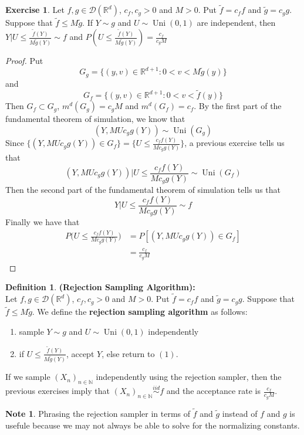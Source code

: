\documentclass[12pt]{amsart}
\theoremstyle{definition}
\newtheorem{defn}[definition]{Definition}
\newtheorem{note}[definition]{Note}
\newtheorem{ex}[definition]{Exercise}
\newcommand{\N}{\mathbb{N}}
\newcommand{\R}{\mathbb{R}}
\newcommand{\MD}{\mathcal{D}}
\newcommand{\iid}{\stackrel{iid}{\sim}}
\DeclareMathOperator{\uni}{Uni}
\begin{document}
	\begin{ex}
		Let $f, g \in \MD(\R^d)$, $c_f,c_g>0$ and $M > 0$. Put $\tilde{f} = c_f f$ and $\tilde{g} = c_g g$. Suppose that $\tilde{f} \leq M \tilde{g}$. If $Y \sim g$ and $U \sim \uni(0,1)$ are independent, then $Y|U \leq \frac{\tilde{f}(Y)}{M\tilde{g}(Y)} \sim f$ and $P ( U \leq \frac{\tilde{f}(Y)}{M\tilde{g}(Y)} ) = \frac{c_f}{c_gM}$ 
	\end{ex}

	\begin{proof}
		Put $$G_g = \{(y,v) \in \R^{d+1}: 0< v < M\tilde{g}(y)\} $$ and $$ G_f = \{(y,v) \in \R^{d+1}: 0< v < \tilde{f}(y)\} $$ 
		Then $G_f \subset G_g$, $m^d(G_g) = c_gM$ and $m^d(G_f) =c_f$. By the first part of the fundamental theorem of simulation, we know that $$(Y, MUc_gg(Y)) \sim \uni(G_g)$$ 
		Since $\{(Y, MUc_gg(Y)) \in G_f \} = \{U \leq \frac{c_ff(Y)}{Mc_gg(Y)}\}$, a previous exercise tells us that $$(Y, MUc_gg(Y))|U \leq \frac{c_ff(Y)}{Mc_gg(Y)} \sim \uni(G_f)$$
		Then the second part of the fundamental theorem of simulation tells us that $$Y|U \leq \frac{c_ff(Y)}{Mc_gg(Y)} \sim f$$
		Finally we have that
		\begin{align*}
			P \bigg( U \leq \frac{c_ff(Y)}{Mc_gg(Y)} \bigg) 
			&= P [(Y, MUc_gg(Y)) \in G_f ]\\
			&= \frac{c_f}{c_gM}
		\end{align*}
	\end{proof}

	\begin{defn}\textbf{(Rejection Sampling Algorithm):} \\
		Let $f, g \in \MD(\R^d)$, $c_f,c_g>0$ and $M > 0$. Put $\tilde{f} = c_f f$ and $\tilde{g} = c_g g$. Suppose that $\tilde{f} \leq M \tilde{g}$. We define the \textbf{rejection sampling algorithm} as follows:
		\begin{enumerate}
			\item sample $Y \sim g$ and $U \sim \uni(0,1)$ independently
			\item if $U \leq \frac{\tilde{f}(Y)}{M\tilde{g}(Y)} $, accept $Y$, else return to $(1)$.
		\end{enumerate}
		If we sample $(X_n)_{n \in \N}$ independently using the rejection sampler, then the previous exercises imply that $(X_n)_{n \in \N} \iid f$ and the acceptance rate is $\frac{c_f}{c_gM}$.
	\end{defn}

	\begin{note}
		Phrasing the rejection sampler in terms of $\tilde{f}$ and $\tilde{g}$ instead of $f$ and $g$ is usefule because we may not always be able to solve for the normalizing constants.
	\end{note}
	
\end{document}
